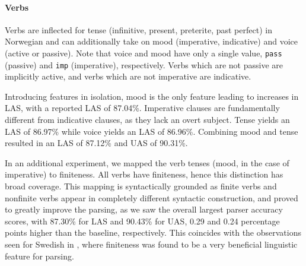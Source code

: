 \documentclass[11pt,a4paper]{article}
\begin{document}
\paragraph{Verbs}
Verbs are inflected for tense (infinitive, present, preterite, past perfect)
in Norwegian and can additionally take on mood (imperative, indicative) and
voice (active or passive). Note that voice and mood have only a single value,
\texttt{pass} (passive) and \texttt{imp} (imperative), respectively. Verbs
which are not passive are implicitly active, and verbs which are not imperative
are indicative.

Introducing features in isolation, mood is the only feature leading to
increases in LAS, with a reported LAS of 87.04\%. Imperative clauses are
fundamentally different from indicative clauses, as they lack an overt subject.
Tense yields an LAS of 86.97\% while voice yields an LAS of 86.96\%. Combining
mood and tense resulted in an LAS of 87.12\% and UAS of 90.31\%.

In an additional experiment, we mapped the verb tenses (mood, in the case of
imperative) to finiteness.  All verbs have finiteness, hence this distinction
has broad coverage.  This mapping is syntactically grounded as finite verbs and
nonfinite verbs appear in completely different syntactic construction, and
proved to greatly improve the parsing, as we saw the overall largest parser
accuracy scores, with 87.30\% for LAS and 90.43\% for UAS, 0.29 and 0.24
percentage points higher than the baseline, respectively. This coincides with
the observations seen for Swedish in , where finiteness was found
to be a very beneficial linguistic feature for parsing.

\end{document}
